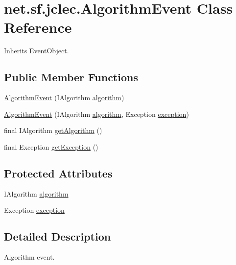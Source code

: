 \hypertarget{classnet_1_1sf_1_1jclec_1_1_algorithm_event}{\section{net.\-sf.\-jclec.\-Algorithm\-Event Class Reference}
\label{classnet_1_1sf_1_1jclec_1_1_algorithm_event}
}


Inherits Event\-Object.

\subsection*{Public Member Functions}
\begin{DoxyCompactItemize}
\item 
\hyperlink{classnet_1_1sf_1_1jclec_1_1_algorithm_event_a059a3f11bca8765181ccbff53f452047}{Algorithm\-Event} (I\-Algorithm \hyperlink{classnet_1_1sf_1_1jclec_1_1_algorithm_event_ae3332a37fbfc99e4c5eea8b0748c1e77}{algorithm})
\item 
\hyperlink{classnet_1_1sf_1_1jclec_1_1_algorithm_event_ab18000f022656286ec8746b2ee936cf7}{Algorithm\-Event} (I\-Algorithm \hyperlink{classnet_1_1sf_1_1jclec_1_1_algorithm_event_ae3332a37fbfc99e4c5eea8b0748c1e77}{algorithm}, Exception \hyperlink{classnet_1_1sf_1_1jclec_1_1_algorithm_event_aa8ed9d4190a583cbe4873dac89fdef7c}{exception})
\item 
final I\-Algorithm \hyperlink{classnet_1_1sf_1_1jclec_1_1_algorithm_event_a3cfac8934c76ad650ceda4280a44f66f}{get\-Algorithm} ()
\item 
final Exception \hyperlink{classnet_1_1sf_1_1jclec_1_1_algorithm_event_a834fbc754fae9b30ab38ddffbed7f136}{get\-Exception} ()
\end{DoxyCompactItemize}
\subsection*{Protected Attributes}
\begin{DoxyCompactItemize}
\item 
I\-Algorithm \hyperlink{classnet_1_1sf_1_1jclec_1_1_algorithm_event_ae3332a37fbfc99e4c5eea8b0748c1e77}{algorithm}
\item 
Exception \hyperlink{classnet_1_1sf_1_1jclec_1_1_algorithm_event_aa8ed9d4190a583cbe4873dac89fdef7c}{exception}
\end{DoxyCompactItemize}


\subsection{Detailed Description}
Algorithm event.

